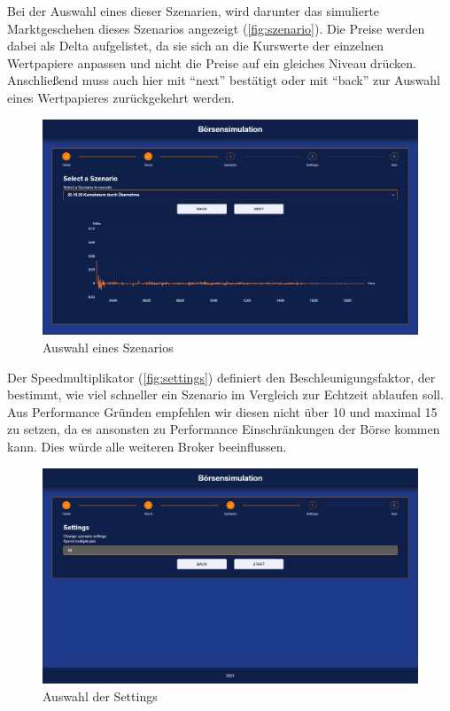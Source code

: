 Bei der Auswahl eines dieser Szenarien, wird darunter das simulierte Marktgeschehen dieses Szenarios angezeigt (\autoref{fig:szenario}). Die Preise werden dabei als Delta aufgelistet, da sie sich an die Kurswerte der einzelnen Wertpapiere anpassen und nicht die Preise auf ein gleiches Niveau drücken. Anschließend muss auch hier mit \enquote{next} bestätigt oder mit \enquote{back} zur Auswahl eines Wertpapieres zurückgekehrt werden. 
\begin{figure}[ht]
	\includegraphics[width=\textwidth]{img/Szenario.png}
	\centering
	\caption{Auswahl eines Szenarios}
	\label{fig:szenario}
\end{figure}

Der Speedmultiplikator (\autoref{fig:settings}) definiert den Beschleunigungsfaktor, der bestimmt, wie viel schneller ein Szenario im Vergleich zur Echtzeit ablaufen soll. Aus Performance Gründen empfehlen wir diesen nicht über 10 und maximal 15 zu setzen, da es ansonsten zu Performance Einschränkungen der Börse kommen kann.
Dies würde alle weiteren Broker beeinflussen.
\begin{figure}[ht]
	\includegraphics[width=\textwidth]{img/Settings.png}
	\centering
	\caption{Auswahl der Settings}
	\label{fig:settings}
\end{figure}

